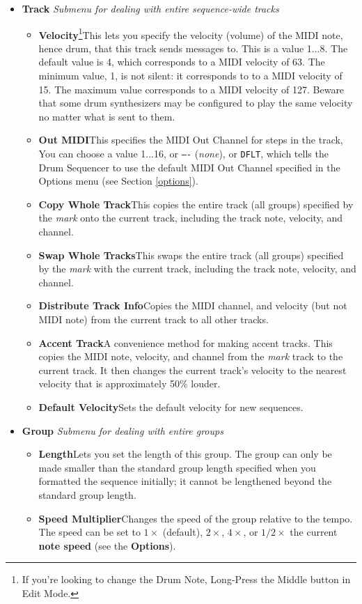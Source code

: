 \documentclass{article}
\begin{document}
\begin{itemize}
\item {\bf Track} {\it Submenu for dealing with entire sequence-wide tracks} \quad 
\begin{itemize}
\item {\bf Velocity}\footnote{If you're looking to change the Drum Note, Long-Press the Middle button in Edit Mode.}\quad This lets you specify the velocity (volume) of the MIDI note, hence drum, that this track sends messages to.  This is a value 1...8.  The default value is 4, which corresponds to a MIDI velocity of 63. The minimum value, 1, is not silent: it corresponds to to a MIDI velocity of 15.  The maximum value corresponds to a MIDI velocity of 127.  Beware that some drum synthesizers may be configured to play the same velocity no matter what is sent to them.
\item {\bf Out MIDI}\quad This specifies the MIDI Out Channel for steps in the track,    You can choose a value 1...16, or \texttt{----} ({\it none}), or \texttt{DFLT}, which tells the Drum Sequencer to use the default MIDI Out Channel specified in the Options menu (see Section \ref{options}).
\item {\bf Copy Whole Track}\quad This copies the entire track (all groups) specified by the {\it mark} onto the current track, including the track note, velocity, and channel.
\item {\bf Swap Whole Tracks}\quad This swaps the entire track (all groups) specified by the {\it mark} with the current track, including the track note, velocity, and channel.
\item {\bf Distribute Track Info}\quad Copies the MIDI channel, and velocity (but not MIDI note) from the current track to all other tracks.  
\item {\bf Accent Track}\quad A convenience method for making accent tracks.  This copies the MIDI note, velocity, and channel from the {\it mark} track to the current track.  It then changes the current track's velocity to the nearest velocity that is approximately 50\% louder.
\item {\bf Default Velocity}\quad Sets the default velocity for new sequences.
\end{itemize}


\item {\bf Group} {\it Submenu for dealing with entire groups} 

\begin{itemize}
\item {\bf Length}\quad Lets you set the length of this group.  The group can only be made smaller than the standard group length specified when you formatted the sequence initially; it cannot be lengthened beyond the standard group length. 
\item {\bf Speed Multiplier}\quad Changes the speed of the group relative to the tempo.   The speed can be set to \(1\times\) (default), \(2\times\), \(4\times\), or \(1/2\times\) the current  {\bf note speed} (see the {\bf Options}).  


\end{itemize}
\end{itemize}
\end{document}
